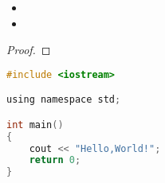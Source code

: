 

\lipsum[1]

\begin{itemize}
	\item \lipsum[2]
	\item \lipsum[3]
\end{itemize} 

\begin{lemma}
	\lipsum[5]
\end{lemma}
\begin{proof}
	\lipsum[6]
\end{proof}

\begin{lstlisting}[language=C, label=lst:c, caption={Hello world!}]
#include <iostream>

using namespace std;

int main() 
{
	cout << "Hello,World!";
	return 0;
}
\end{lstlisting}